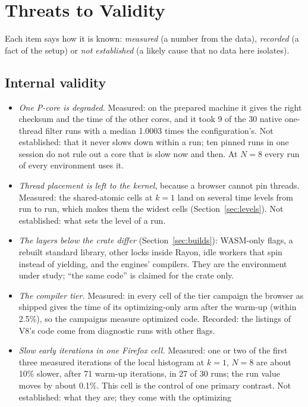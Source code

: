 \section{Threats to Validity}
\label{sec:threats}

Each item says how it is known: \emph{measured} (a number from the data),
\emph{recorded} (a fact of the setup) or \emph{not established} (a likely
cause that no data here isolates).

\subsection{Internal validity}

\begin{itemize}[leftmargin=1.5em]
\item \emph{One P-core is degraded.} Measured: on the prepared machine it
gives the right checksum and the time of the other cores, and it took 9 of
the 30 native one-thread filter runs with a median 1.0003 times the
configuration's. Not established: that it never slows down within a run;
ten pinned runs in one session do not rule out a core that is slow now and
then. At $N=8$ every run of every environment uses it.
\item \emph{Thread placement is left to the kernel}, because a browser
cannot pin threads. Measured: the shared-atomic cells at $k=1$ land on
several time levels from run to run, which makes them the widest cells
(Section~\ref{sec:levels}). Not established: what sets the level of a run.
\item \emph{The layers below the crate differ} (Section~\ref{sec:builds}):
WASM-only flags, a rebuilt standard library, other locks inside Rayon, idle
workers that spin instead of yielding, and the engines' compilers. They are
the environment under study; ``the same code'' is claimed for the crate
only.
\item \emph{The compiler tier.} Measured: in every cell of the tier
campaign the browser as shipped gives the time of its optimizing-only arm after
the warm-up (within 2.5\%), so the campaigns measure optimized code. Recorded: the listings of
V8's code come from diagnostic runs with other flags.
\item \emph{Slow early iterations in one Firefox cell.} Measured: one or
two of the first three measured iterations of the local histogram at $k=1$,
$N=8$ are about 10\% slower, after 71 warm-up iterations, in 27 of 30 runs;
the run value moves by about 0.1\%. This cell is the control of one primary
contrast. Not established: what they are; they come with the optimizing

\end{itemize}
